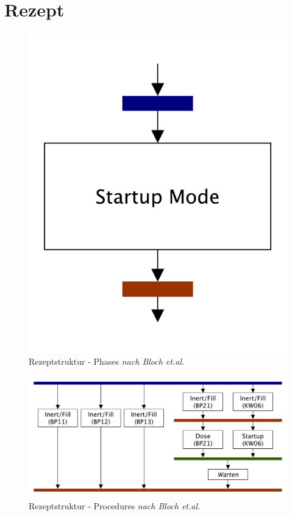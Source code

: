 \section{Rezept}
\label{A:Rezept}
\begin{figure}[h]
\centering
\includegraphics[scale=0.37]{DA_files/Bilder/Anhang/Phases.pdf}
\caption[Rezeptstruktur modulare Anlage - Phases \textit{nach Bloch et.al.}]{Rezeptstruktur - Phases \textit{nach Bloch et.al.} \citep[53]{Bloch2017}}
\end{figure}

\begin{figure}[h]
\centering
\includegraphics[scale=0.3]{DA_files/Bilder/Anhang/Procedures.pdf}
\caption[Rezeptstruktur modulare Anlage - Procedures \textit{nach Bloch et.al.}]{Rezeptstruktur - Procedures \textit{nach Bloch et.al.} \citep[53]{Bloch2017}}
\end{figure}

